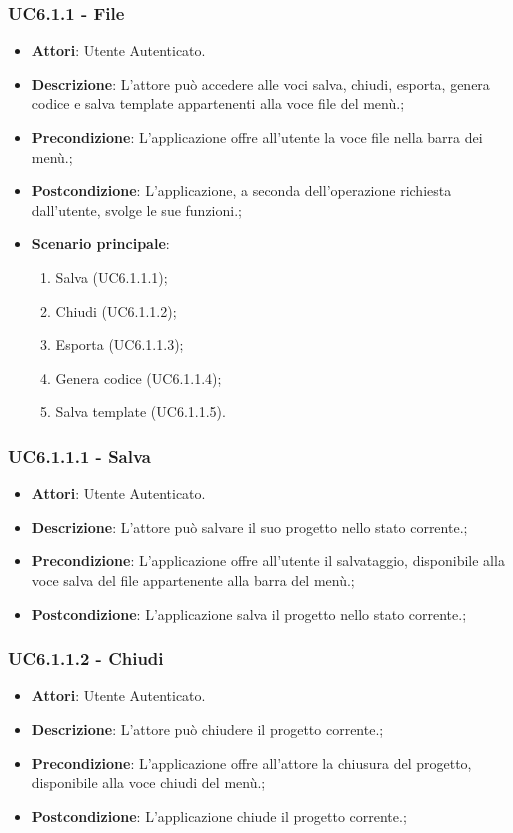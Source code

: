 \subsubsection{UC6.1.1 - File} 
\label{sssec:UC6.1.1} 
\begin{itemize} 
\item \textbf{Attori}: Utente Autenticato.
\item \textbf{Descrizione}: L’attore può accedere alle voci salva, chiudi, esporta, genera codice e salva template appartenenti alla voce file del menù.;
\item \textbf{Precondizione}: L’applicazione offre all’utente la voce file nella barra dei menù.;
\item \textbf{Postcondizione}: L’applicazione, a seconda dell’operazione richiesta dall’utente,
svolge le sue funzioni.;
\item \textbf{Scenario principale}: \begin{enumerate}\item Salva (UC6.1.1.1);\item Chiudi (UC6.1.1.2);\item Esporta (UC6.1.1.3);\item Genera codice (UC6.1.1.4);\item Salva template (UC6.1.1.5). 
 \end{enumerate}
\end{itemize} 
\subsubsection{UC6.1.1.1 - Salva} 
\label{sssec:UC6.1.1.1} 
\begin{itemize} 
\item \textbf{Attori}: Utente Autenticato.
\item \textbf{Descrizione}: L’attore può salvare il suo progetto nello stato
corrente.;
\item \textbf{Precondizione}: L’applicazione offre all’utente il salvataggio, disponibile alla voce salva del file appartenente alla barra del menù.;
\item \textbf{Postcondizione}: L’applicazione salva il progetto nello stato corrente.;
\end{itemize} 
\subsubsection{UC6.1.1.2 - Chiudi} 
\label{sssec:UC6.1.1.2} 
\begin{itemize} 
\item \textbf{Attori}: Utente Autenticato.
\item \textbf{Descrizione}: L’attore può chiudere il progetto corrente.;
\item \textbf{Precondizione}: L’applicazione offre all’attore la chiusura del progetto, disponibile
alla voce chiudi del menù.;
\item \textbf{Postcondizione}: L’applicazione chiude il progetto corrente.;
\end{itemize} 
